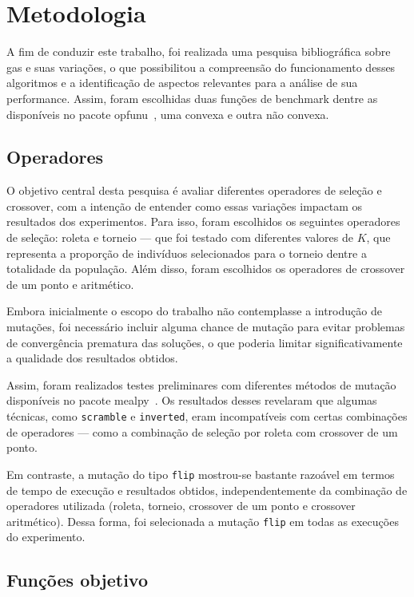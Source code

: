 \section{Metodologia}%
\label{sec:metodologia}

A fim de conduzir este trabalho, foi realizada uma pesquisa bibliográfica sobre \glspl{ga} e suas variações, o que possibilitou a compreensão do funcionamento desses algoritmos e a identificação de aspectos relevantes para a análise de sua performance.
Assim, foram escolhidas duas funções de benchmark dentre as disponíveis no pacote \gls{opfunu}~\cite{opfunu_software}, uma convexa e outra não convexa.

\subsection{Operadores}

O objetivo central desta pesquisa é avaliar diferentes operadores de seleção e \gls{crossover}, com a intenção de entender como essas variações impactam os resultados dos experimentos.
Para isso, foram escolhidos os seguintes operadores de seleção: roleta e torneio --- que foi testado com diferentes valores de \(K\), que representa a proporção de indivíduos selecionados para o torneio dentre a totalidade da população.
Além disso, foram escolhidos os operadores de \gls{crossover} de um ponto e aritmético.

Embora inicialmente o escopo do trabalho não contemplasse a introdução de mutações, foi necessário incluir alguma chance de mutação para evitar problemas de convergência prematura das soluções, o que poderia limitar significativamente a qualidade dos resultados obtidos.

Assim, foram realizados testes preliminares com diferentes métodos de mutação disponíveis no pacote \gls{mealpy}~\cite{mealpy_software}.
Os resultados desses revelaram que algumas técnicas, como \texttt{scramble} e \texttt{inverted}, eram incompatíveis com certas combinações de operadores --- como a combinação de seleção por roleta com crossover de um ponto.

Em contraste, a mutação do tipo \texttt{flip} mostrou-se bastante razoável em termos de tempo de execução e resultados obtidos, independentemente da combinação de operadores utilizada (roleta, torneio, crossover de um ponto e crossover aritmético).
Dessa forma, foi selecionada a mutação \texttt{flip} em todas as execuções do experimento.

\subsection{Funções objetivo}

